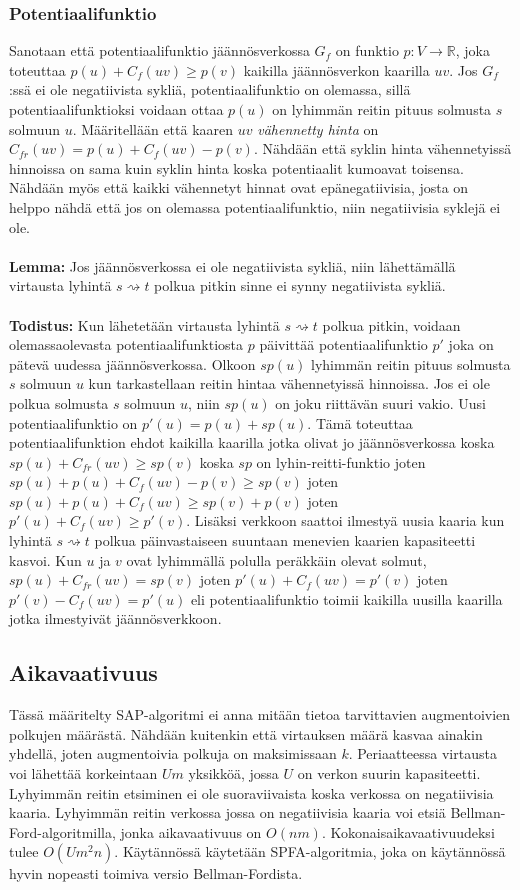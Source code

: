 \documentclass[a4paper, 11pt]{article}
\begin{document}
\subsubsection*{Potentiaalifunktio}
Sanotaan että potentiaalifunktio jäännösverkossa $G_f$ on funktio 
$p: V \rightarrow \mathbb{R}$, joka toteuttaa
$p(u) + C_f(uv) \ge p(v)$ kaikilla jäännösverkon kaarilla $uv$. Jos $G_f$:ssä ei ole 
negatiivista sykliä, potentiaalifunktio
on olemassa, sillä potentiaalifunktioksi voidaan ottaa $p(u)$ on lyhimmän reitin pituus
solmusta $s$ solmuun $u$.
Määritellään että kaaren $uv$ \textit{vähennetty hinta} on $C_{fr}(uv) = p(u) + C_f(uv) - p(v)$.
Nähdään että syklin hinta vähennetyissä hinnoissa on sama kuin syklin hinta koska potentiaalit
kumoavat toisensa. Nähdään myös
että kaikki vähennetyt hinnat ovat epänegatiivisia, josta on helppo nähdä että jos on
olemassa potentiaalifunktio, niin negatiivisia syklejä ei ole.\\\\
\noindent
\textbf{Lemma:} Jos jäännösverkossa ei ole negatiivista sykliä, niin lähettämällä virtausta
lyhintä $s \rightsquigarrow t$ polkua pitkin sinne ei synny negatiivista sykliä.\\\\
\noindent
\textbf{Todistus:} Kun lähetetään virtausta lyhintä $s \rightsquigarrow t$ polkua pitkin, voidaan
olemassaolevasta potentiaalifunktiosta $p$ 
päivittää potentiaalifunktio $p'$ joka on pätevä uudessa jäännösverkossa.
Olkoon $sp(u)$ lyhimmän reitin pituus
solmusta $s$ solmuun $u$ kun tarkastellaan reitin hintaa vähennetyissä hinnoissa.
Jos ei ole polkua solmusta $s$ solmuun $u$, niin $sp(u)$ on joku riittävän suuri vakio.
Uusi potentiaalifunktio on $p'(u) = p(u) + sp(u)$. Tämä toteuttaa potentiaalifunktion
ehdot kaikilla kaarilla jotka olivat jo jäännösverkossa koska $sp(u) + C_{fr}(uv) \ge sp(v)$
koska $sp$ on lyhin-reitti-funktio joten $sp(u) + p(u) + C_f(uv) - p(v) \ge sp(v)$
joten $sp(u) + p(u) + C_f(uv) \ge sp(v) + p(v)$ joten $p'(u) + C_f(uv) \ge p'(v)$.
Lisäksi verkkoon saattoi ilmestyä uusia kaaria kun lyhintä $s \rightsquigarrow t$ polkua
päinvastaiseen suuntaan menevien kaarien kapasiteetti kasvoi. Kun $u$ ja $v$ ovat
lyhimmällä polulla peräkkäin olevat solmut, $sp(u) + C_{fr}(uv) = sp(v)$ joten
$p'(u) + C_f(uv) = p'(v)$ joten $p'(v) - C_f(uv) = p'(u)$ eli potentiaalifunktio
toimii kaikilla uusilla kaarilla jotka ilmestyivät jäännösverkkoon.
\subsection*{Aikavaativuus}
Tässä määritelty SAP-algoritmi ei anna mitään tietoa tarvittavien augmentoivien
polkujen määrästä. Nähdään kuitenkin että virtauksen määrä kasvaa ainakin yhdellä, joten
augmentoivia polkuja on maksimissaan $k$. Periaatteessa virtausta voi lähettää 
korkeintaan $Um$ yksikköä, jossa $U$ on verkon suurin kapasiteetti. Lyhyimmän reitin
etsiminen ei ole suoraviivaista koska verkossa on negatiivisia kaaria. Lyhyimmän reitin
verkossa jossa on negatiivisia kaaria
voi etsiä Bellman-Ford-algoritmilla, jonka aikavaativuus on $O(nm)$.
Kokonaisaikavaativuudeksi tulee $O(Um^2n)$. Käytännössä käytetään
SPFA-algoritmia, joka on käytännössä hyvin nopeasti toimiva versio Bellman-Fordista.
\end{document}
